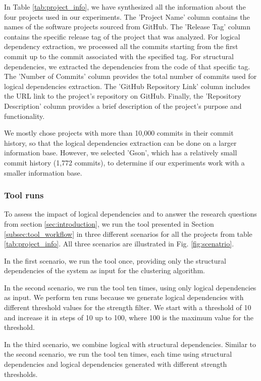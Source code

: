 \documentclass{ieeeaccess}
\begin{document}
In Table \ref{tab:project_info}, we have synthesized all the information about the four projects used in our experiments. The 'Project Name' column contains the names of the software projects sourced from GitHub. The 'Release Tag' column contains the specific release tag of the project that was analyzed. For logical dependency extraction, we processed all the commits starting from the first commit up to the commit associated with the specified tag. For structural dependencies, we extracted the dependencies from the code of that specific tag. The 'Number of Commits' column provides the total number of commits used for logical dependencies extraction. The 'GitHub Repository Link' column includes the URL link to the project's repository on GitHub. Finally, the 'Repository Description' column provides a brief description of the project's purpose and functionality.

We mostly chose projects with more than 10,000 commits in their commit history, so that the logical dependencies extraction can be done on a larger information base. However, we selected 'Gson', which has a relatively small commit history (1,772 commits), to determine if our experiments work with a smaller information base.

\subsubsection{Tool runs}

To assess the impact of logical dependencies and to answer the research questions from section \ref{sec:introduction}, we run the tool presented in Section \ref{subsec:tool_workflow} in three different scenarios for all the projects from table \ref{tab:project_info}. All three scenarios are illustrated in Fig. \ref{fig:scenatrio}.

In the first scenario, we run the tool once, providing only the structural dependencies of the system as input for the clustering algorithm.

In the second scenario, we run the tool ten times, using only logical dependencies as input. We perform ten runs because we generate logical dependencies with different threshold values for the strength filter. We start with a threshold of 10 and increase it in steps of 10 up to 100, where 100 is the maximum value for the threshold.

In the third scenario, we combine logical with structural dependencies. Similar to the second scenario, we run the tool ten times, each time using structural dependencies and logical dependencies generated with different strength thresholds.
\end{document}
